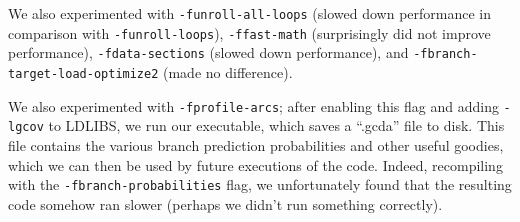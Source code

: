 \documentclass{article} %
\begin{document}
We also experimented with \texttt{-funroll-all-loops} (slowed down performance in
comparison with \texttt{-funroll-loops}), \texttt{-ffast-math} (surprisingly
did not improve performance), \texttt{-fdata-sections} (slowed down performance),
and \texttt{-fbranch-target-load-optimize2} (made no difference).

We also experimented with \texttt{-fprofile-arcs}; after enabling this
flag and adding \texttt{-lgcov} to LDLIBS, we run our executable, which saves a
``.gcda'' file to disk. This file contains the various branch prediction
probabilities and other useful goodies, which we can then be used by future
executions of the code. Indeed, recompiling with the
\texttt{-fbranch-probabilities} flag, we unfortunately found that the resulting
code somehow ran slower (perhaps we didn't run something correctly).

\small


\end{document}
